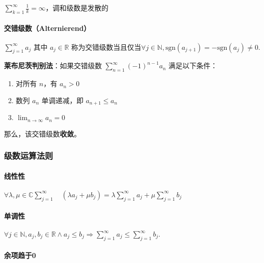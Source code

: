 \documentclass[a4paper,12pt]{article}
\providecommand{\tightlist}{\setlength{\itemsep}{0pt}\setlength{\parskip}{0pt}}
\begin{document}
\(\sum_{k=1}^\infty \frac{1}{k} = \infty\)，调和级数是发散的

\paragraph{交错级数（Alternierend）}\label{ux4ea4ux9519ux7ea7ux6570alternierend}

\(\sum_{j=1}^{\infty} a_j \text{ 其中 } a_j \in \mathbb{R} \text{ 称为交错级数当且仅当} \forall j \in \mathbb{N} , \text{sgn}(a_{j+1}) = -\text{sgn}(a_j) \neq 0.\)

\textbf{莱布尼茨判别法}：如果交错级数
\(\sum_{n=1}^{\infty} (-1)^{n-1}a_n\) 满足以下条件：

\begin{enumerate}
\def\labelenumi{\arabic{enumi}.}
\tightlist
\item
  对所有 \(n\)，有 \(a_n > 0\)
\item
  数列 \({a_n}\) 单调递减，即 \(a_{n+1} \leq a_n\)
\item
  \(\lim_{n \to \infty} a_n = 0\)
\end{enumerate}

那么，该交错级数\textbf{收敛}。

\subsubsection{级数运算法则}\label{ux7ea7ux6570ux8fd0ux7b97ux6cd5ux5219}

\paragraph{线性性}\label{ux7ebfux6027ux6027}

\(\forall \lambda,\mu \in \mathbb{C} \sum_{j = 1}^\infty\quad (\lambda a_j +\mu b_j) = \lambda\sum_{j = 1}^\infty a_j + \mu\sum_{j=1}^\infty b_j\)

\paragraph{单调性}\label{ux5355ux8c03ux6027}

\(\forall j \in \mathbb{N}, a_j, b_j \in \mathbb{R} \land a_j \leq b_j \Rightarrow \sum_{j=1}^{\infty} a_j \leq \sum_{j=1}^{\infty} b_j.\)

\paragraph{余项趋于0}\label{ux4f59ux9879ux8d8bux4e8e0}
\end{document}
